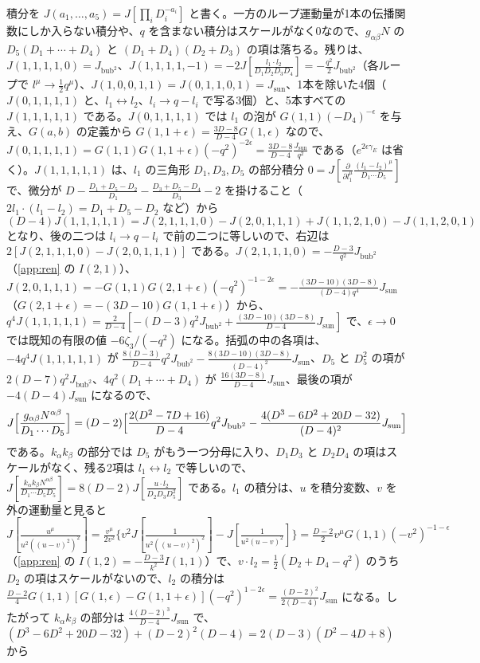 \documentclass[a4paper,10pt]{ltjsarticle}
\begin{document}
積分を $J(a_1,\dots,a_5)=J[\prod_iD_i^{-a_i}]$ と書く。一方のループ運動量が1本の伝播関数にしか入らない積分や、$q$ を含まない積分はスケールがなく0なので、$g_{\alpha\beta}N$ の $D_5(D_1+\cdots+D_4)$ と $(D_1+D_4)(D_2+D_3)$ の項は落ちる。残りは、$J(1,1,1,1,0)=J_{\mathrm{bub}^2}$、$J(1,1,1,1,-1)=-2J[\frac{l_1\cdot l_2}{D_1D_2D_3D_4}]=-\frac{q^2}2J_{\mathrm{bub}^2}$（各ループで $l^\mu\to\frac12q^\mu$）、$J(1,0,0,1,1)=J(0,1,1,0,1)=J_{\mathrm{sun}}$、1本を除いた4個（$J(0,1,1,1,1)$ と、$l_1\leftrightarrow l_2$、$l_i\to q-l_i$ で写る3個）と、5本すべての $J(1,1,1,1,1)$ である。$J(0,1,1,1,1)$ では $l_1$ の泡が $G(1,1)(-D_4)^{-\epsilon}$ を与え、$G(a,b)$ の定義から $G(1,1+\epsilon)=\frac{3D-8}{D-4}G(1,\epsilon)$ なので、$J(0,1,1,1,1)=G(1,1)G(1,1+\epsilon)(-q^2)^{-2\epsilon}=\frac{3D-8}{D-4}\frac{J_{\mathrm{sun}}}{q^2}$ である（$e^{2\epsilon\gamma_E}$ は省く）。$J(1,1,1,1,1)$ は、$l_1$ の三角形 $D_1,D_3,D_5$ の部分積分 $0=J[\frac{\partial}{\partial l_1^\mu}\frac{(l_1-l_2)^\mu}{D_1\cdots D_5}]$ で、微分が $D-\frac{D_1+D_5-D_2}{D_1}-\frac{D_3+D_5-D_4}{D_3}-2$ を掛けること（$2l_1\cdot(l_1-l_2)=D_1+D_5-D_2$ など）から
\begin{equation*}
(D-4)J(1,1,1,1,1)=J(2,1,1,1,0)-J(2,0,1,1,1)+J(1,1,2,1,0)-J(1,1,2,0,1)
\end{equation*}
となり、後の二つは $l_i\to q-l_i$ で前の二つに等しいので、右辺は $2[J(2,1,1,1,0)-J(2,0,1,1,1)]$ である。$J(2,1,1,1,0)=-\frac{D-3}{q^2}J_{\mathrm{bub}^2}$（\ref{app:ren} の $I(2,1)$）、$J(2,0,1,1,1)=-G(1,1)G(2,1+\epsilon)(-q^2)^{-1-2\epsilon}=-\frac{(3D-10)(3D-8)}{(D-4)q^4}J_{\mathrm{sun}}$（$G(2,1+\epsilon)=-(3D-10)G(1,1+\epsilon)$）から、$q^4J(1,1,1,1,1)=\frac2{D-4}[-(D-3)q^2J_{\mathrm{bub}^2}+\frac{(3D-10)(3D-8)}{D-4}J_{\mathrm{sun}}]$ で、$\epsilon\to0$ では既知の有限の値 $-6\zeta_3/(-q^2)$ になる。括弧の中の各項は、$-4q^4J(1,1,1,1,1)$ が $\frac{8(D-3)}{D-4}q^2J_{\mathrm{bub}^2}-\frac{8(3D-10)(3D-8)}{(D-4)^2}J_{\mathrm{sun}}$、$D_5$ と $D_5^2$ の項が $2(D-7)q^2J_{\mathrm{bub}^2}$、$4q^2(D_1+\cdots+D_4)$ が $\frac{16(3D-8)}{D-4}J_{\mathrm{sun}}$、最後の項が $-4(D-4)J_{\mathrm{sun}}$ になるので、
\begin{equation*}
J\Bigl[\frac{g_{\alpha\beta}N^{\alpha\beta}}{D_1\cdots D_5}\Bigr]=(D-2)\Bigl[\frac{2(D^2-7D+16)}{D-4}q^2J_{\mathrm{bub}^2}-\frac{4(D^3-6D^2+20D-32)}{(D-4)^2}J_{\mathrm{sun}}\Bigr]
\end{equation*}
である。$k_\alpha k_\beta$ の部分では $D_5$ がもう一つ分母に入り、$D_1D_3$ と $D_2D_4$ の項はスケールがなく、残る2項は $l_1\leftrightarrow l_2$ で等しいので、$J[\frac{k_\alpha k_\beta N^{\alpha\beta}}{D_1\cdots D_5D_5}]=8(D-2)J[\frac{u\cdot l_2}{D_2D_3D_5^2}]$ である。$l_1$ の積分は、$u$ を積分変数、$v$ を外の運動量と見ると $J[\frac{u^\mu}{u^2((u-v)^2)^2}]=\frac{v^\mu}{2v^2}\{v^2J[\frac1{u^2((u-v)^2)^2}]-J[\frac1{u^2(u-v)^2}]\}=\frac{D-2}2v^\mu G(1,1)(-v^2)^{-1-\epsilon}$（\ref{app:ren} の $I(1,2)=-\frac{D-3}{k^2}I(1,1)$）で、$v\cdot l_2=\frac12(D_2+D_4-q^2)$ のうち $D_2$ の項はスケールがないので、$l_2$ の積分は $\frac{D-2}4G(1,1)[G(1,\epsilon)-G(1,1+\epsilon)](-q^2)^{1-2\epsilon}=\frac{(D-2)^2}{2(D-4)}J_{\mathrm{sun}}$ になる。したがって $k_\alpha k_\beta$ の部分は $\frac{4(D-2)^3}{D-4}J_{\mathrm{sun}}$ で、$(D^3-6D^2+20D-32)+(D-2)^2(D-4)=2(D-3)(D^2-4D+8)$ から
\end{document}
